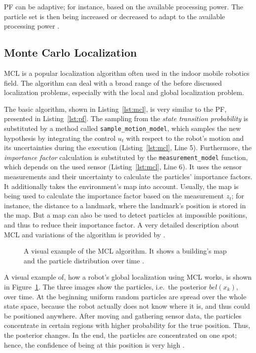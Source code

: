 \ac{PF} can be adaptive; for instance, based on the available processing power. The particle set is then being increased or decreased to adapt to the available processing power \citep{thrun:prob_robo}.


\subsection{Monte Carlo Localization}\label{sec:fund_mcl}
\ac{MCL} is a popular localization algorithm often used in the indoor mobile robotics field. The algorithm can deal with a broad range of the before discussed localization problems, especially with the local and global localization problem.



The basic algorithm, shown in Listing~\ref{lst:mcl}, is very similar to the \ac{PF}, presented in Listing~\ref{lst:pf}. The sampling from the \emph{state transition probability} is substituted by a method called \texttt{sample\_motion\_model}, which samples the new hypothesis by integrating the control $u_t$ with respect to the robot's motion and its uncertainties during the execution (Listing~\ref{lst:mcl}, Line 5). Furthermore, the \emph{importance factor} calculation is substituted by the \texttt{measurement\_model} function, which depends on the used sensor (Listing~\ref{lst:mcl}, Line 6). It uses the sensor measurements and their uncertainty to calculate the particles' importance factors. It additionally takes the environment's map into account. Usually, the map is being used to calculate the importance factor based on the measurement $z_t$; for instance, the distance to a landmark, where the landmark's position is stored in the map. But a map can also be used to detect particles at impossible positions, and thus to reduce their importance factor. A very detailed description about \acl{MCL} and variations of the algorithm is provided by \citet{thrun:prob_robo}.

\begin{figure}[width=0.9\textwidth, height=0.4\textheight]
	
	\caption{A visual example of the \acl{MCL} algorithm. It shows a building's map and the particle distribution over time \citep{thrun:prob_robo}.}
	\label{fig:mcl}
\end{figure}

A visual example of, how a robot's global localization using \ac{MCL} works, is shown in Figure~\ref{fig:mcl}. The three images show the particles, i.e.\ the posterior $bel(x_k)$, over time. At the beginning uniform random particles are spread over the whole state space, because the robot actually does not know where it is, and thus could be positioned anywhere. After moving and gathering sensor data, the particles concentrate in certain regions with higher probability for the true position. Thus, the posterior changes. In the end, the particles are concentrated on one spot; hence, the confidence of being at this position is very high \citep{thrun:prob_robo}.


